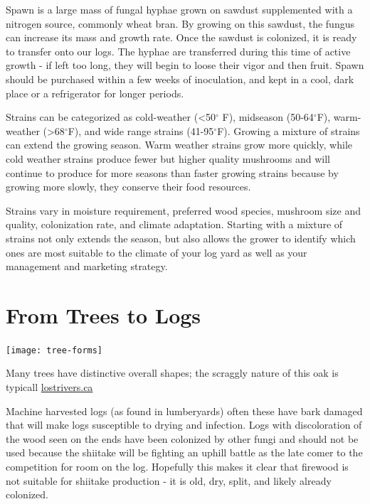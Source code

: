 \documentclass{tufte-handout}
\begin{document}
Spawn is a large mass of fungal hyphae grown on sawdust supplemented with a nitrogen source, commonly wheat bran. 
By growing on this sawdust, the fungus can increase its mass and growth rate. Once the sawdust is colonized, it is ready to transfer onto our logs.
The hyphae are transferred during this time of active growth  - if left too long, they will begin to loose their vigor and then fruit. 
Spawn should be purchased within a few weeks of inoculation, and kept in a cool, dark place or a refrigerator for longer periods. 

Strains can be categorized as cold-weather (<50$^{\circ}$ F), midseason (50-64$^{\circ}$F), warm-weather (>68$^{\circ}$F), and wide range strains (41-95$^{\circ}$F). 
Growing a mixture of strains can extend the growing season. 
Warm weather strains grow more quickly, while cold weather strains produce fewer but higher quality mushrooms and will continue to produce for more seasons than faster growing strains because by growing more slowly, they conserve their food resources.

Strains vary in moisture requirement, preferred wood species, mushroom size and quality, colonization rate, and climate adaptation. 
Starting with a mixture of strains not only extends the season,  but also allows the grower to identify which ones are most
suitable to the climate of your log yard as well as your management
and marketing strategy.

\section{From Trees to Logs}

\begin{marginfigure}
\texttt{[image: tree-forms]}
\caption{Many trees have distinctive overall shapes; the scraggly nature of this oak is typicall \href{http://www.lostrivers.ca/content/points/treeswinter.html}{lostrivers.ca}}
\end{marginfigure}

 Machine harvested logs (as found in lumberyards) often these have bark damaged that will make logs susceptible to drying and infection. 
Logs with discoloration of the wood seen on the ends have been colonized by other fungi and should not be used because the shiitake will be fighting an uphill battle as the late comer to the competition for room on the log.
Hopefully this makes it clear that firewood is not suitable for shiitake production - it is old, dry, split, and likely already colonized.
\end{document}
